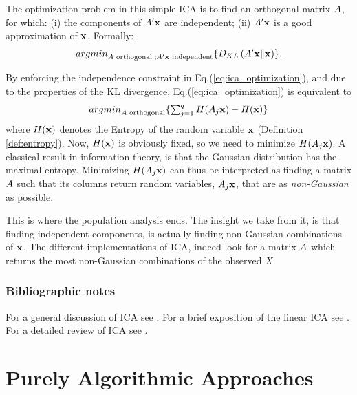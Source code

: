 \documentclass[12pt,a4paper]{article}
\begin{document}
The optimization problem in this simple ICA is to find an orthogonal matrix $A$, for which:
(i) the components of $A'\mathbf{x}$ are independent;
(ii) $A'\mathbf{x}$ is a good approximation of $\mathbf{x}$.
Formally: 
\begin{align}
\label{eq:ica_optimization}
\textstyle{\mathop{argmin}_{A\text{ orthogonal} \;; A'\mathbf{x}\text{ independent}}}\{ D_{KL}\left(A'\mathbf{x} \Vert \mathbf{x} \right) \}.
\end{align}


By enforcing the independence constraint in Eq.(\ref{eq:ica_optimization}), and due to the properties of the KL divergence, Eq.(\ref{eq:ica_optimization}) is equivalent to
\begin{align}
\label{eq:ica_optimization2}
\textstyle{\mathop{argmin}_{A\text{ orthogonal}}}\{ \sum_{j=1}^{q} H(A_j\mathbf{x})- H(\mathbf{x}) \}
\end{align}
where $H(\mathbf{x})$ denotes the Entropy of the random variable $\mathbf{x}$ (Definition \ref{def:entropy}).
Now, $H(\mathbf{x})$ is obviously fixed, so we need to minimize $H(A_j\mathbf{x})$. 
A classical result in information theory, is that the Gaussian distribution has the maximal entropy. 
Minimizing $H(A_j\mathbf{x})$ can thus be interpreted as finding a matrix $A$ such that its columns return random variables, $A_j\mathbf{x}$, that are as \emph{non-Gaussian} as possible.

This is where the population analysis ends. 
The insight we take from it, is that finding independent components, is actually finding non-Gaussian combinations of $\mathbf{x}$. 
The different implementations of ICA, indeed look for a matrix $A$ which returns the most non-Gaussian combinations of the observed $X$. 








\subsubsection{Bibliographic notes}
For a general discussion of ICA see \cite{jolliffe2002principal}.
For a brief exposition of the linear ICA see \cite{friedman2001elements}. 
For a detailed review of ICA see \cite{hyvarinen2000independent}. 








\section{Purely Algorithmic Approaches}
\end{document}

